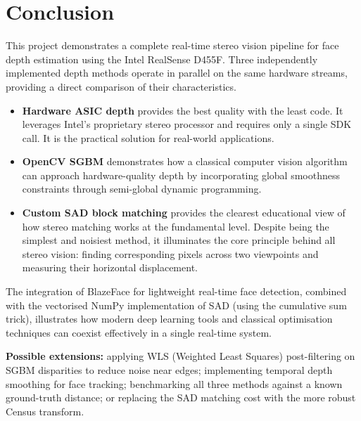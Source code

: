 \documentclass[12pt, a4paper]{article}
\begin{document}
\section{Conclusion}

This project demonstrates a complete real-time stereo vision pipeline for face
depth estimation using the Intel RealSense D455F. Three independently
implemented depth methods operate in parallel on the same hardware streams,
providing a direct comparison of their characteristics.

\begin{itemize}
  \item \textbf{Hardware ASIC depth} provides the best quality with the least
        code. It leverages Intel's proprietary stereo processor and requires
        only a single SDK call. It is the practical solution for real-world
        applications.

  \item \textbf{OpenCV SGBM} demonstrates how a classical computer vision
        algorithm can approach hardware-quality depth by incorporating global
        smoothness constraints through semi-global dynamic programming.

  \item \textbf{Custom SAD block matching} provides the clearest educational
        view of how stereo matching works at the fundamental level. Despite
        being the simplest and noisiest method, it illuminates the core
        principle behind all stereo vision: finding corresponding pixels across
        two viewpoints and measuring their horizontal displacement.
\end{itemize}

The integration of BlazeFace for lightweight real-time face detection, combined
with the vectorised NumPy implementation of SAD (using the cumulative sum
trick), illustrates how modern deep learning tools and classical optimisation
techniques can coexist effectively in a single real-time system.

\begin{notebox}
\textbf{Possible extensions:} applying WLS (Weighted Least Squares)
post-filtering on SGBM disparities to reduce noise near edges; implementing
temporal depth smoothing for face tracking; benchmarking all three methods
against a known ground-truth distance; or replacing the SAD matching cost with
the more robust Census transform.
\end{notebox}
\end{document}
